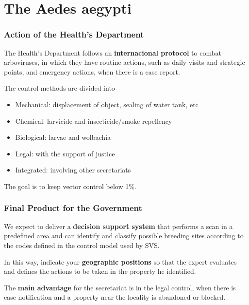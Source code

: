 \documentclass{beamer}
\begin{document}
	\section{The Aedes aegypti}

	\begin{frame}
		\frametitle{Action of the Health's Department}

		The Health's Department follows an \textbf{internacional protocol} to combat arboviruses, in which they have routine actions, such as daily visits and strategic points, and emergency actions, when there is a case report.
		\newline

		The control methods are divided into
		\begin{itemize}
			\item Mechanical: displacement of object, sealing of water tank, etc
			\item Chemical: larvicide and insecticide/smoke repellency
			\item Biological: larvae and wolbachia
			\item Legal: with the support of justice
			\item Integrated: involving other secretariats
		\end{itemize}

		\vspace{3.5mm}
		The goal is to keep vector control below 1\%.
	\end{frame}

	\begin{frame}
		\frametitle{Final Product for the Government}

		We expect to deliver a \textbf{decision support system} that performs a scan in a predefined area and can identify and classify possible breeding sites according to the codes defined in the control model used by SVS.
		\newline

		In this way, indicate your \textbf{geographic positions} so that the expert evaluates and defines the actions to be taken in the property he identified.
		\newline

		The \textbf{main advantage} for the secretariat is in the legal control, when there is case notification and a property near the locality is abandoned or blocked.
	\end{frame}
\end{document}
